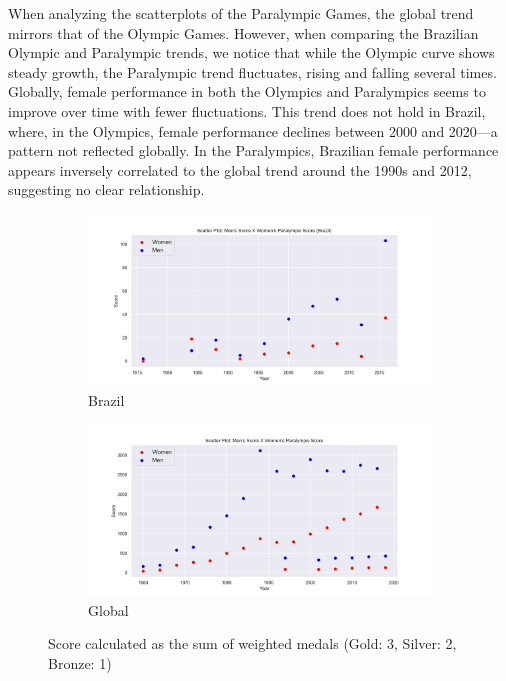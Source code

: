 \documentclass{article}
\begin{document}
When analyzing the scatterplots of the Paralympic Games, the global trend mirrors that of the Olympic Games. However, when comparing the Brazilian Olympic and Paralympic trends, we notice that while the Olympic curve shows steady growth, the Paralympic trend fluctuates, rising and falling several times. Globally, female performance in both the Olympics and Paralympics seems to improve over time with fewer fluctuations. This trend does not hold in Brazil, where, in the Olympics, female performance declines between 2000 and 2020—a pattern not reflected globally. In the Paralympics, Brazilian female performance appears inversely correlated to the global trend around the 1990s and 2012, suggesting no clear relationship.

\begin{figure}[H]
    \centering
    \begin{subfigure}[b]{0.49\textwidth}
        \centering
        \includegraphics[width=\linewidth]{images/female_participation/scatterplot_paralymp_score_bra.png} 
        \caption{Brazil}
        \label{fig:image1}
    \end{subfigure}
    \begin{subfigure}[b]{0.49\textwidth}
        \centering
        \includegraphics[width=\linewidth]{images/female_participation/scatterplot_paralymp_score_global.png} 
        \caption{Global}
        \label{fig:image2}
    \end{subfigure}
    \caption{Score calculated as the sum of weighted medals (Gold: 3, Silver: 2, Bronze: 1)}
    \label{fig:sidebyside}
\end{figure}
\end{document}
